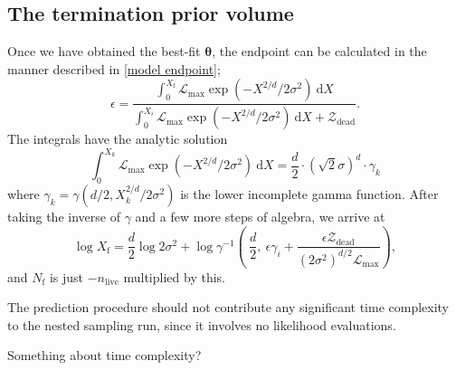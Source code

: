 \documentclass[usenatbib]{mnras}
\newcommand{\thetab}{\bm{\theta}}
\newcommand{\nlive}{n_\mathrm{live}}
\newcommand{\Like}{\mathcal{L}}
\begin{document}
\subsection{The termination prior volume}
Once we have obtained the best-fit $\thetab$, the endpoint can be calculated in the manner described in \cref{model endpoint};
\begin{equation}
	\epsilon = \frac{\int_0^{X_\mathrm{f}} \Like_\mathrm{max} \exp\left(-X^{2/d}/2\sigma^2\right)\ \mathrm{d}X}{\int_0^{X_i} \Like_\mathrm{max} \exp\left(-X^{2/d}/2\sigma^2\right)\ \mathrm{d}X + \mathcal{Z}_\mathrm{dead}}.
\end{equation}
The integrals have the analytic solution
\begin{equation}
	\int_0^{X_k} \Like_\mathrm{max} \exp\left(-X^{2/d}/2\sigma^2\right)\ \mathrm{d}X = \frac{d}{2} \cdot \left(\sqrt{2}\sigma\right)^d \cdot \gamma_k
\end{equation}
where $\gamma_k = \gamma\left(d/2, X_k^{2/d}/2\sigma^2\right)$ is the lower incomplete gamma function. After taking the inverse of  $\gamma$ and a few more steps of algebra, we arrive at
\begin{equation}
	\log X_\mathrm{f} = \frac{d}{2}\log 2\sigma^2	+ \log \gamma^{-1} \left(\ \frac{d}{2} ,\ \epsilon \gamma_i+ \frac{\epsilon\mathcal{Z}_\mathrm{dead}}{ \left( 2\sigma^2 \right)^{d/2}\Like_\mathrm{max}}\right),
\end{equation}
and $N_\mathrm{f}$ is just  $-\nlive$ multiplied by this.
\par
The prediction procedure should not contribute any significant time complexity to the nested sampling run, since it involves no likelihood evaluations.
\par
Something about time complexity?
\end{document}
